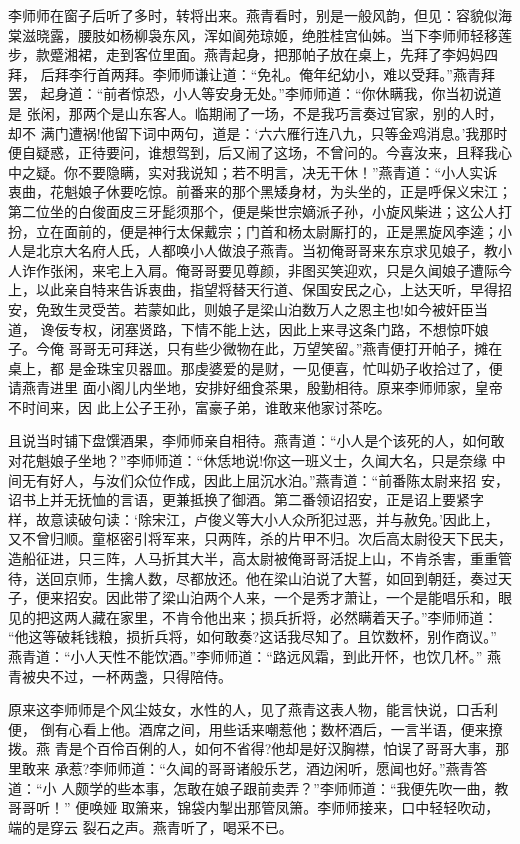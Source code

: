李师师在窗子后听了多时，转将出来。燕青看时，别是一般风韵，但见：容貌似海
棠滋晓露，腰肢如杨柳袅东风，浑如阆苑琼姬，绝胜桂宫仙姊。当下李师师轻移莲
步，款蹙湘裙，走到客位里面。燕青起身，把那帕子放在桌上，先拜了李妈妈四拜，
后拜李行首两拜。李师师谦让道：“免礼。俺年纪幼小，难以受拜。”燕青拜罢，
起身道：“前者惊恐，小人等安身无处。”李师师道：“你休瞒我，你当初说道是
张闲，那两个是山东客人。临期闹了一场，不是我巧言奏过官家，别的人时，却不
满门遭祸!他留下词中两句，道是：‘六六雁行连八九，只等金鸡消息。’我那时
便自疑惑，正待要问，谁想驾到，后又闹了这场，不曾问的。今喜汝来，且释我心
中之疑。你不要隐瞒，实对我说知；若不明言，决无干休！”燕青道：“小人实诉
衷曲，花魁娘子休要吃惊。前番来的那个黑矮身材，为头坐的，正是呼保义宋江；
第二位坐的白俊面皮三牙髭须那个，便是柴世宗嫡派子孙，小旋风柴进；这公人打
扮，立在面前的，便是神行太保戴宗；门首和杨太尉厮打的，正是黑旋风李逵；小
人是北京大名府人氏，人都唤小人做浪子燕青。当初俺哥哥来东京求见娘子，教小
人诈作张闲，来宅上入肩。俺哥哥要见尊颜，非图买笑迎欢，只是久闻娘子遭际今
上，以此亲自特来告诉衷曲，指望将替天行道、保国安民之心，上达天听，早得招
安，免致生灵受苦。若蒙如此，则娘子是梁山泊数万人之恩主也!如今被奸臣当道，
谗佞专权，闭塞贤路，下情不能上达，因此上来寻这条门路，不想惊吓娘子。今俺
哥哥无可拜送，只有些少微物在此，万望笑留。”燕青便打开帕子，摊在桌上，都
是金珠宝贝器皿。那虔婆爱的是财，一见便喜，忙叫奶子收拾过了，便请燕青进里
面小阁儿内坐地，安排好细食茶果，殷勤相待。原来李师师家，皇帝不时间来，因
此上公子王孙，富豪子弟，谁敢来他家讨茶吃。

且说当时铺下盘馔酒果，李师师亲自相待。燕青道：“小人是个该死的人，如何敢
对花魁娘子坐地？”李师师道：“休恁地说!你这一班义士，久闻大名，只是奈缘
中间无有好人，与汝们众位作成，因此上屈沉水泊。”燕青道：“前番陈太尉来招
安，诏书上并无抚恤的言语，更兼抵换了御酒。第二番领诏招安，正是诏上要紧字
样，故意读破句读：‘除宋江，卢俊义等大小人众所犯过恶，并与赦免。’因此上，
又不曾归顺。童枢密引将军来，只两阵，杀的片甲不归。次后高太尉役天下民夫，
造船征进，只三阵，人马折其大半，高太尉被俺哥哥活捉上山，不肯杀害，重重管
待，送回京师，生擒人数，尽都放还。他在梁山泊说了大誓，如回到朝廷，奏过天
子，便来招安。因此带了梁山泊两个人来，一个是秀才萧让，一个是能唱乐和，眼
见的把这两人藏在家里，不肯令他出来；损兵折将，必然瞒着天子。”李师师道：
“他这等破耗钱粮，损折兵将，如何敢奏?这话我尽知了。且饮数杯，别作商议。”
燕青道：“小人天性不能饮酒。”李师师道：“路远风霜，到此开怀，也饮几杯。”
燕青被央不过，一杯两盏，只得陪侍。

原来这李师师是个风尘妓女，水性的人，见了燕青这表人物，能言快说，口舌利便，
倒有心看上他。酒席之间，用些话来嘲惹他；数杯酒后，一言半语，便来撩拨。燕
青是个百伶百俐的人，如何不省得?他却是好汉胸襟，怕误了哥哥大事，那里敢来
承惹?李师师道：“久闻的哥哥诸般乐艺，酒边闲听，愿闻也好。”燕青答道：“小
人颇学的些本事，怎敢在娘子跟前卖弄？”李师师道：“我便先吹一曲，教哥哥听！”
便唤娅取箫来，锦袋内掣出那管凤箫。李师师接来，口中轻轻吹动，端的是穿云
裂石之声。燕青听了，喝采不已。

